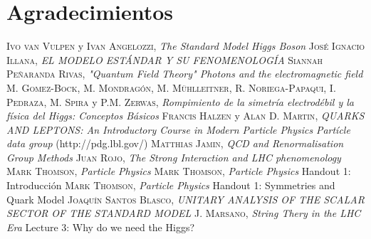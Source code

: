 \documentclass[11pt, a4paper]{article}
\begin{document}
\section {Agradecimientos}













\newpage
\begin{thebibliography}{99}
 \textsc{Ivo van Vulpen} y \textsc{Ivan Angelozzi},
\textit{The Standard Model Higgs Boson}
 \textsc{José Ignacio Illana},
\textit{EL MODELO ESTÁNDAR Y SU FENOMENOLOGÍA}
 \textsc{Siannah Peñaranda Rivas},
\textit{"Quantum Field Theory" Photons and the electromagnetic field}
 \textsc{M. Gomez-Bock}, \textsc{M. Mondragón}, \textsc{M. Mühlleitner}, \textsc{R. Noriega-Papaqui}, \textsc{I. Pedraza}, \textsc{M. Spira} y \textsc{P.M. Zerwas},
\textit{Rompimiento de la simetría electrodébil y la física del Higgs: Conceptos Básicos}
 \textsc{Francis Halzen} y \textsc{Alan D. Martin},
\textit{QUARKS AND LEPTONS: An Introductory Course in Modern Particle Physics}
 \textit{Partícle data group} (http://pdg.lbl.gov/)
 \textsc{Matthias Jamin},
\textit{QCD and Renormalisation Group Methods}
\textsc{Juan Rojo},
\textit{The Strong Interaction and LHC phenomenology}
 \textsc{Mark Thomson},
\textit{Particle Physics}
 \textsc{Mark Thomson},
\textit{Particle Physics} Handout 1: Introducción
 \textsc{Mark Thomson},
\textit{Particle Physics} Handout 1: Symmetries and Quark Model
 \textsc{Joaquín Santos Blasco},
\textit{UNITARY ANALYSIS OF THE SCALAR SECTOR OF THE STANDARD MODEL}
 \textsc{J. Marsano},
\textit{String Thery in the LHC Era} Lecture 3: Why do we need the Higgs? 

\end{thebibliography}
\end{document}
